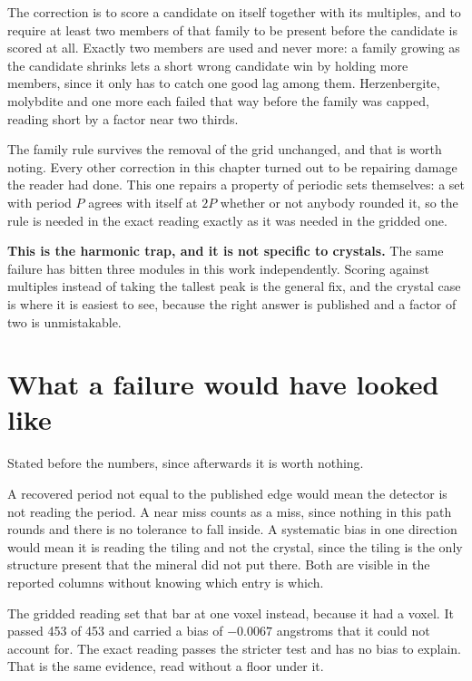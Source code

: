 The correction is to score a candidate on itself together with its multiples, and to require at least two members of that family to be present before the candidate is scored at all. Exactly two members are used and never more: a family growing as the candidate shrinks lets a short wrong candidate win by holding more members, since it only has to catch one good lag among them. Herzenbergite, molybdite and one more each failed that way before the family was capped, reading short by a factor near two thirds.

The family rule survives the removal of the grid unchanged, and that is worth noting. Every other correction in this chapter turned out to be repairing damage the reader had done. This one repairs a property of periodic sets themselves: a set with period $P$ agrees with itself at $2P$ whether or not anybody rounded it, so the rule is needed in the exact reading exactly as it was needed in the gridded one.

\textbf{This is the harmonic trap, and it is not specific to crystals.} The same failure has bitten three modules in this work independently. Scoring against multiples instead of taking the tallest peak is the general fix, and the crystal case is where it is easiest to see, because the right answer is published and a factor of two is unmistakable.

\section{What a failure would have looked like}

Stated before the numbers, since afterwards it is worth nothing.

A recovered period not equal to the published edge would mean the detector is not reading the period. A near miss counts as a miss, since nothing in this path rounds and there is no tolerance to fall inside. A systematic bias in one direction would mean it is reading the tiling and not the crystal, since the tiling is the only structure present that the mineral did not put there. Both are visible in the reported columns without knowing which entry is which.

The gridded reading set that bar at one voxel instead, because it had a voxel. It passed 453 of 453 and carried a bias of $-0.0067$ angstroms that it could not account for. The exact reading passes the stricter test and has no bias to explain. That is the same evidence, read without a floor under it.
